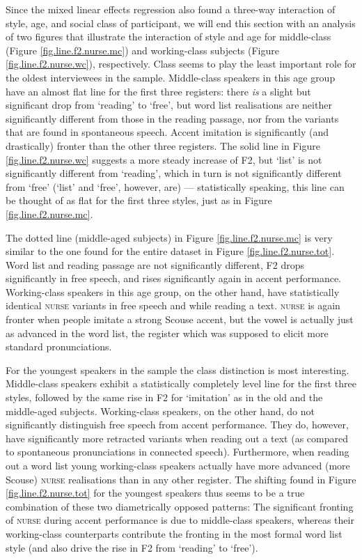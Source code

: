Since the mixed linear effects regression also found a three-way interaction of style, age, and social class of participant, we will end this section with an analysis of two figures that illustrate the interaction of style and age for middle-class (Figure \ref{fig.line.f2.nurse.mc}) and working-class subjects (Figure \ref{fig.line.f2.nurse.wc}), respectively.
Class seems to play the least important role for the oldest interviewees in the sample.
Middle-class speakers in this age group have an almost flat line for the first three registers: there \emph{is} a slight but significant drop from `reading' to `free', but word list realisations are neither significantly different from those in the reading passage, nor from the variants that are found in spontaneous speech.
Accent imitation is significantly (and drastically) fronter than the other three registers.
The solid line in Figure \ref{fig.line.f2.nurse.wc} suggests a more steady increase of F2, but `list' is not significantly different from `reading', which in turn is not significantly different from `free' (`list' and `free', however, are) --- statistically speaking, this line can be thought of as flat for the first three styles, just as in Figure \ref{fig.line.f2.nurse.mc}.

The dotted line (middle-aged subjects) in Figure \ref{fig.line.f2.nurse.mc} is very similar to the one found for the entire dataset in Figure \ref{fig.line.f2.nurse.tot}.
Word list and reading passage are not significantly different, F2 drops significantly in free speech, and rises significantly again in accent performance.
Working-class speakers in this age group, on the other hand, have statistically identical \textsc{nurse} variants in free speech and while reading a text.
\textsc{nurse} is again fronter when people imitate a strong Scouse accent, but the vowel is actually just as advanced in the word list, the register which was supposed to elicit more standard pronunciations.

For the youngest speakers in the sample the class distinction is most interesting.
Middle-class speakers exhibit a statistically completely level line for the first three styles, followed by the same rise in F2 for `imitation' as in the old and the middle-aged subjects.
Working-class speakers, on the other hand, do not significantly distinguish free speech from accent performance.
They do, however, have significantly more retracted variants when reading out a text (as compared to spontaneous pronunciations in connected speech).
Furthermore, when reading out a word list young working-class speakers actually have more advanced (more Scouse) \textsc{nurse} realisations than in any other register.
The shifting found in Figure \ref{fig.line.f2.nurse.tot} for the youngest speakers thus seems to be a true combination of these two diametrically opposed patterns: The significant fronting of \textsc{nurse} during accent performance is due to middle-class speakers, whereas their working-class counterparts contribute the fronting in the most formal word list style (and also drive the rise in F2 from `reading' to `free').

